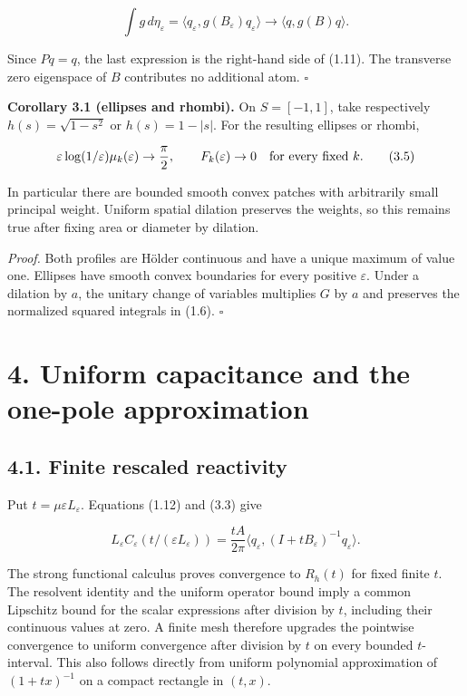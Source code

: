 \documentclass[11pt]{article}
\begin{document}
\[
\int g\,d\eta_\varepsilon
 =\langle q_\varepsilon,g(B_\varepsilon)q_\varepsilon\rangle
 \longrightarrow\langle q,g(B)q\rangle.
\tag{3.4}
\]

Since \(Pq=q\), the last expression is the right-hand side of (1.11).
The transverse zero eigenspace of \(B\) contributes no additional atom.
\(\square\)

\textbf{Corollary 3.1 (ellipses and rhombi).} On \(S=[-1,1]\), take
respectively \(h(s)=\sqrt{1-s^2}\) or \(h(s)=1-|s|\). For the resulting
ellipses or rhombi,

\[
\varepsilon\log(1/\varepsilon)\mu_k(\varepsilon)\to\frac\pi2,
\qquad F_k(\varepsilon)\to0
\quad\hbox{for every fixed }k.
\tag{3.5}
\]

In particular there are bounded smooth convex patches with arbitrarily
small principal weight. Uniform spatial dilation preserves the weights,
so this remains true after fixing area or diameter by dilation.

\emph{Proof.} Both profiles are Hölder continuous and have a unique
maximum of value one. Ellipses have smooth convex boundaries for every
positive \(\varepsilon\). Under a dilation by \(a\), the unitary change
of variables multiplies \(G\) by \(a\) and preserves the normalized
squared integrals in (1.6). \(\square\)

\section{4. Uniform capacitance and the one-pole
approximation}\label{uniform-capacitance-and-the-one-pole-approximation}

\subsection{4.1. Finite rescaled
reactivity}\label{finite-rescaled-reactivity}

Put \(t=\mu\varepsilon L_\varepsilon\). Equations (1.12) and (3.3) give

\[
L_\varepsilon C_\varepsilon(t/(\varepsilon L_\varepsilon))
 =\frac{tA}{2\pi}
 \langle q_\varepsilon,(I+tB_\varepsilon)^{-1}q_\varepsilon\rangle.
\tag{4.1}
\]

The strong functional calculus proves convergence to \(R_h(t)\) for
fixed finite \(t\). The resolvent identity and the uniform operator
bound imply a common Lipschitz bound for the scalar expressions after
division by \(t\), including their continuous values at zero. A finite
mesh therefore upgrades the pointwise convergence to uniform convergence
after division by \(t\) on every bounded \(t\)-interval. This also
follows directly from uniform polynomial approximation of
\((1+tx)^{-1}\) on a compact rectangle in \((t,x)\).
\end{document}
